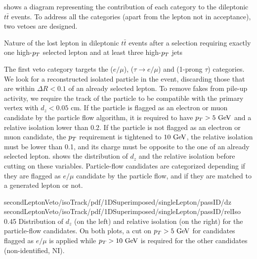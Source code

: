      shows a diagram representing
    the contribution of each category to the dileptonic $t\bar{t}$ events. To address all
    the categories (apart from the lepton not in acceptance), two vetoes are designed.

                 {Nature of the lost lepton in dileptonic $t\bar{t}$ events after a selection
                 requiring exactly one high-$p_T$ selected lepton and at least three
                 high-$p_T$ jets}

    The first veto category targets the ($e/\mu$), ($\tau \rightarrow e/\mu$) and
    (1-prong $\tau$) categories. We look for a reconstructed isolated particle in the event,
    discarding those that are within $\Delta R < 0.1$ of an already selected lepton. To
    remove fakes from pile-up activity, we require the track of the particle to be
    compatible with the primary vertex with $d_z < 0.05$ cm.
    If the particle is flagged as an electron or muon candidate by the particle flow algorithm,
    it is required to have $p_T > 5~\text{GeV}$ and a relative isolation lower than 0.2.
    If the particle is not flagged as an electron or muon candidate, the $p_T$ requirement
    is tightened to $10~\text{GeV}$, the relative isolation must be lower than 0.1, and its charge
    must be opposite to the one of an already selected lepton.
     shows the distribution of $d_z$ and the
    relative isolation before cutting on these variables. Particle-flow candidates are categorized depending if
    they are flagged as $e/\mu$ candidate by the particle flow, and if they are matched to a
    generated lepton or not.

                     {secondLeptonVeto/isoTrack/pdf/1DSuperimposed/singleLepton/passID/dz}
                     {secondLeptonVeto/isoTrack/pdf/1DSuperimposed/singleLepton/passID/relIso}
                     {0.45}
                     {Distribution of $d_z$ (on the left) and relative isolation (on the right)
                     for the particle-flow candidates. On both plots, a cut on $p_T > 5~\text{GeV}$ for candidates
                     flagged as $e/\mu$ is applied while $p_T > 10~\text{GeV}$ is required for
                     the other candidates (non-identified, NI).}

